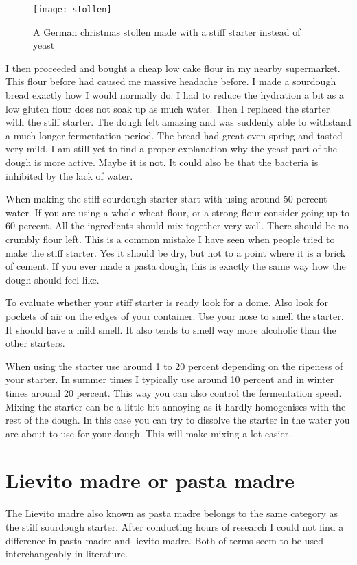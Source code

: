 \begin{figure}[!htb]
  \texttt{[image: stollen]}
  \caption{A German christmas stollen made with a stiff starter instead of yeast}
  \label{fig:stollen}
\end{figure}

I then proceeded and bought a cheap low cake flour in my nearby supermarket.
This flour before had caused me massive headache before. I made a sourdough bread
exactly how I would normally do. I had to reduce the hydration a bit as a low
gluten flour does not soak up as much water. Then I replaced the starter with
the stiff starter. The dough felt amazing and was suddenly able to withstand a
much longer fermentation period. The bread had great oven spring and tasted
very mild. I am still yet to find a proper explanation why the yeast part of
the dough is more active. Maybe it is not. It could also be that the bacteria
is inhibited by the lack of water.

When making the stiff sourdough starter start with using around 50 percent
water. If you are using a whole wheat flour, or a strong flour consider going
up to 60 percent. All the ingredients should mix together very well. There
should be no crumbly flour left. This is a common mistake I have seen when
people tried to make the stiff starter. Yes it should be dry, but not to a
point where it is a brick of cement. If you ever made a pasta dough, this is
exactly the same way how the dough should feel like.

To evaluate whether your stiff starter is ready look for a dome. Also look for
pockets of air on the edges of your container. Use your nose to smell the
starter. It should have a mild smell. It also tends to smell way more
alcoholic than the other starters.

When using the starter use around 1 to 20 percent depending on the ripeness of
your starter. In summer times I typically use around 10 percent and in winter
times around 20 percent. This way you can also control the fermentation speed.
Mixing the starter can be a little bit annoying as it hardly homogenises with
the rest of the dough. In this case you can try to dissolve the starter in the
water you are about to use for your dough. This will make mixing a lot easier.


\section{Lievito madre or pasta madre}

The Lievito madre also known as pasta madre belongs to the same category as
the stiff sourdough starter. After conducting hours of research I could not
find a difference in pasta madre and lievito madre. Both of terms seem to be
used interchangeably in literature.

